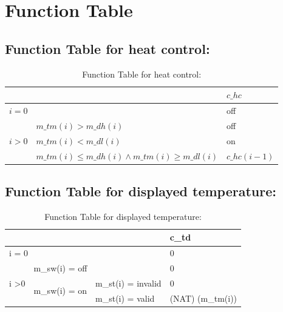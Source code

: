 \documentclass[fontsize=12pt,paper=letter,twoside]{scrartcl}
\begin{document}
\section{Function Table}

\subsection{Function Table for heat control: }
\begin{table}[htb]
\centering
\begin{tabular}{ll|l|}
\cline{3-3}
                                                      &                                                                                & $c\_hc$      \\ \hline
\multicolumn{2}{|l|}{$i=0$}                                                                                                              & off        \\ \hline
\multicolumn{1}{|l|}{\multirow{3}{*}{$i > 0$}} & $m\_tm(i) > m\_dh(i)$                                                 & off        \\ \cline{2-3}
\multicolumn{1}{|l|}{}                                & $m\_tm(i) < m\_dl(i)$                                                    & on         \\ \cline{2-3}
\multicolumn{1}{|l|}{}                                & $m\_tm(i) \le m\_dh(i) \wedge  m\_tm(i) \ge m\_dl(i)$ & $c\_hc(i-1)$ \\ \hline
\end{tabular}
\caption{Function Table for heat control: }
\end{table}

\subsection{Function Table for displayed temperature: }
\begin{table}[]
\centering
\label{my-label}
\begin{tabular}{lll|l|}
\cline{4-4}
                                                        &                                                     &                    & c\_td            \\ \hline
\multicolumn{3}{|l|}{i = 0}                                                                                                        & 0                \\ \hline
\multicolumn{1}{|l|}{\multirow{3}{*}{i \textgreater 0}} & \multicolumn{2}{l|}{m\_sw(i) = off}                                      & 0                \\ \cline{2-4}
\multicolumn{1}{|l|}{}                                  & \multicolumn{1}{l|}{\multirow{2}{*}{m\_sw(i) = on}} & m\_st(i) = invalid & 0                \\ \cline{3-4}
\multicolumn{1}{|l|}{}                                  & \multicolumn{1}{l|}{}                               & m\_st(i) = valid   & (NAT) (m\_tm(i)) \\ \hline
\end{tabular}
\caption{Function Table for displayed temperature: }
\end{table}
\end{document}
